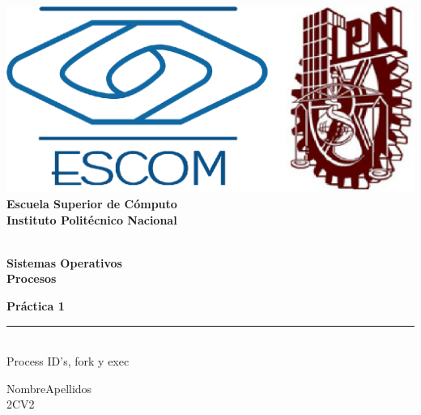 
\begin{titlepage} %

    \begin{flushright}

	   \includegraphics[scale=0.15]{imagenes/escom-ipn.png}
	   \large \textbf{\\Escuela Superior de C\'omputo}
	   \large \textbf{\\Instituto Polit\'ecnico Nacional }%

	   \vspace{2.5cm} %

	   \large \textbf{\\Sistemas Operativos}%
	   \large \textbf{\\Procesos}%

	   \vspace{1.2cm} %

	   \large \textbf{Pr\'actica 1}\\%
	   \rule{6cm}{3pt} %
	   \large{\\ Process ID's, fork y exec} %

	   \vspace{2.5cm} %

	   NombreApellidos \\ %
	   2CV2 %

	   \vspace{2.5cm} %

	   \date{\today}

    \end{flushright}

\end{titlepage}
